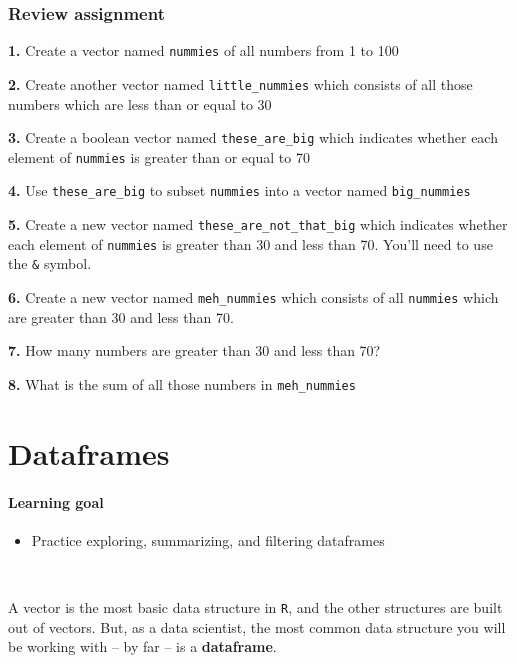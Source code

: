 \documentclass[]{book}
\providecommand{\tightlist}{%
  \setlength{\itemsep}{0pt}\setlength{\parskip}{0pt}}
\begin{document}
\hypertarget{review-assignment}{%
\subsection*{Review assignment}\label{review-assignment}}

\textbf{1.} Create a vector named \texttt{nummies} of all numbers from 1 to 100

\textbf{2.} Create another vector named \texttt{little\_nummies} which consists of all those numbers which are less than or equal to 30

\textbf{3.} Create a boolean vector named \texttt{these\_are\_big} which indicates whether each element of \texttt{nummies} is greater than or equal to 70

\textbf{4.} Use \texttt{these\_are\_big} to subset \texttt{nummies} into a vector named \texttt{big\_nummies}

\textbf{5.} Create a new vector named \texttt{these\_are\_not\_that\_big} which indicates whether each element of \texttt{nummies} is greater than 30 and less than 70. You'll need to use the \texttt{\&} symbol.

\textbf{6.} Create a new vector named \texttt{meh\_nummies} which consists of all \texttt{nummies} which are greater than 30 and less than 70.

\textbf{7.} How many numbers are greater than 30 and less than 70?

\textbf{8.} What is the sum of all those numbers in \texttt{meh\_nummies}

\hypertarget{dataframes}{%
\chapter{Dataframes}\label{dataframes}}

\hypertarget{learning-goal}{%
\subsubsection*{Learning goal}\label{learning-goal}}

\begin{itemize}
\tightlist
\item
  Practice exploring, summarizing, and filtering dataframes
\end{itemize}

~

A vector is the most basic data structure in \texttt{R}, and the other structures are built out of vectors. But, as a data scientist, the most common data structure you will be working with -- by far -- is a \textbf{dataframe}.
\end{document}
